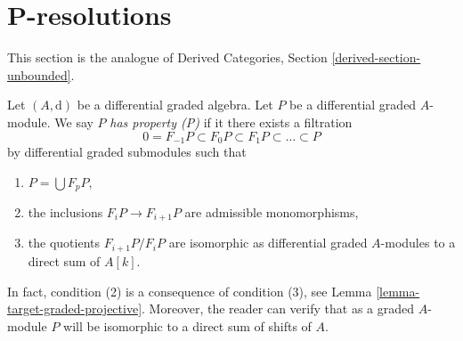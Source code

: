 \section{P-resolutions}
\label{section-P-resolutions}

\noindent
This section is the analogue of
Derived Categories, Section \ref{derived-section-unbounded}.

\medskip\noindent
Let $(A, \text{d})$ be a differential graded algebra.
Let $P$ be a differential graded $A$-module. We say $P$
{\it has property (P)} if it there exists a filtration
$$
0 = F_{-1}P \subset F_0P \subset F_1P \subset \ldots \subset P
$$
by differential graded submodules such that
\begin{enumerate}
\item $P = \bigcup F_pP$,
\item the inclusions $F_iP \to F_{i + 1}P$ are admissible
monomorphisms,
\item the quotients $F_{i + 1}P/F_iP$ are isomorphic as differential
graded $A$-modules to a direct sum of $A[k]$.
\end{enumerate}
In fact, condition (2) is a consequence of condition (3), see
Lemma \ref{lemma-target-graded-projective}. Moreover, the reader
can verify that as a graded $A$-module $P$ will be isomorphic to a
direct sum of shifts of $A$.

